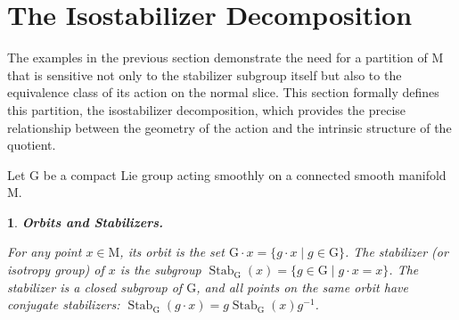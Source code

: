 \documentclass[10pt,reqno,letterpaper,twoside]{amsart}
\theoremstyle{article}
\newtheorem{article}{}
\def\artlabel[#1]{\textbf{#1.}}
\def \G{\mathrm G}
\def \M{\mathrm M}
\DeclareMathOperator{\Stab}{Stab}
\begin{document}
  
  \section{The Isostabilizer Decomposition}
  \label{sec:Isostabilizer_Decomposition}
  
  The examples in the previous section demonstrate the need for a partition of $\M$ that is sensitive not only to the stabilizer subgroup itself but also to the equivalence class of its action on the normal slice.
  This section formally defines this partition,
  the isostabilizer decomposition,
  which provides the precise relationship between the geometry of the action and the intrinsic structure of the quotient.
  
  Let $\G$ be a compact Lie group acting smoothly on a connected smooth manifold $\M$.
  \begin{article}
    \artlabel[Orbits and Stabilizers]
    \label{Orbits_and_Stabilizers}
    
    For any point $x \in \M$,
    its \emph{orbit} is the set $\G \cdot x = \{g \cdot x \mid g \in \G\}$.
    The \emph{stabilizer} (or isotropy group) of $x$ is the subgroup $\Stab_\G(x) = \{g \in \G \mid g \cdot x = x\}$.
    The stabilizer is a closed subgroup of $\G$,
    and all points on the same orbit have conjugate stabilizers: $\Stab_\G(g \cdot x) = g \Stab_\G(x) g^{-1}$.
    
  \end{article}
  
\end{document}
